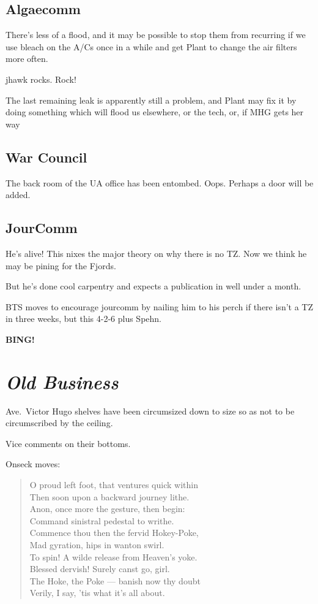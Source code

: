 \documentclass[10pt]{article}
\newcommand{\bing}{{\bf BING!} }
\newcommand{\goto}[1]{\bing \vskip 12pt \section*{{\em{#1}}}}
\newcommand{\ps}{ plus Spehn\xspace}
\begin{document}
\subsection*{Algaecomm}
There's less of a flood, and it may be possible to stop them from
recurring if we use bleach on the A/Cs once in a while and get Plant
to change the air filters more often.

jhawk rocks.  Rock!

The last remaining leak is apparently still a problem, and Plant may
fix it by doing something which will flood us elsewhere, or the tech,
or, if MHG gets her way 

\subsection*{War Council}

The back room of the UA office has been entombed.  Oops.  Perhaps a
door will be added.

\subsection*{JourComm}

He's alive!  This nixes the major theory on why there is no TZ.
Now we think he may be pining for the Fjords.  

But he's done cool carpentry and expects a publication in well under a
month.

BTS moves to encourage jourcomm by nailing him to his perch if there
isn't a TZ in three weeks, but this 4-2-6\ps.

\goto{Old Business} 

Ave.\ Victor Hugo shelves have been circumsized
down to size so as not to be circumscribed by the ceiling.

Vice comments on their bottoms.

Onseck moves:

\begin{quotation}
       O proud left foot, that ventures quick within \\
       Then soon upon a backward journey lithe.\\
       Anon, once more the gesture, then begin:\\
       Command sinistral pedestal to writhe.\\
       Commence thou then the fervid Hokey-Poke,\\
       Mad gyration, hips in wanton swirl.\\
       To spin! A wilde release from Heaven's yoke.\\
       Blessed dervish! Surely canst go, girl.\\
       The Hoke, the Poke --- banish now thy doubt\\
       Verily, I say, 'tis what it's all about.\\
\end{quotation}
\end{document}
